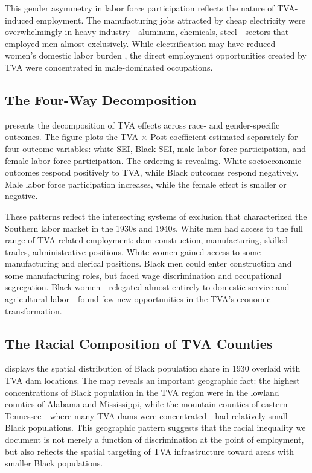 \documentclass[12pt]{article}
\begin{document}
This gender asymmetry in labor force participation reflects the nature of TVA-induced employment. The manufacturing jobs attracted by cheap electricity were overwhelmingly in heavy industry---aluminum, chemicals, steel---sectors that employed men almost exclusively. While electrification may have reduced women's domestic labor burden \citep{dinkelman2011}, the direct employment opportunities created by TVA were concentrated in male-dominated occupations.

\subsection{The Four-Way Decomposition}

 presents the decomposition of TVA effects across race- and gender-specific outcomes. The figure plots the TVA $\times$ Post coefficient estimated separately for four outcome variables: white SEI, Black SEI, male labor force participation, and female labor force participation. The ordering is revealing. White socioeconomic outcomes respond positively to TVA, while Black outcomes respond negatively. Male labor force participation increases, while the female effect is smaller or negative.

These patterns reflect the intersecting systems of exclusion that characterized the Southern labor market in the 1930s and 1940s. White men had access to the full range of TVA-related employment: dam construction, manufacturing, skilled trades, administrative positions. White women gained access to some manufacturing and clerical positions. Black men could enter construction and some manufacturing roles, but faced wage discrimination and occupational segregation. Black women---relegated almost entirely to domestic service and agricultural labor---found few new opportunities in the TVA's economic transformation.

\subsection{The Racial Composition of TVA Counties}

 displays the spatial distribution of Black population share in 1930 overlaid with TVA dam locations. The map reveals an important geographic fact: the highest concentrations of Black population in the TVA region were in the lowland counties of Alabama and Mississippi, while the mountain counties of eastern Tennessee---where many TVA dams were concentrated---had relatively small Black populations. This geographic pattern suggests that the racial inequality we document is not merely a function of discrimination at the point of employment, but also reflects the spatial targeting of TVA infrastructure toward areas with smaller Black populations.
\end{document}
